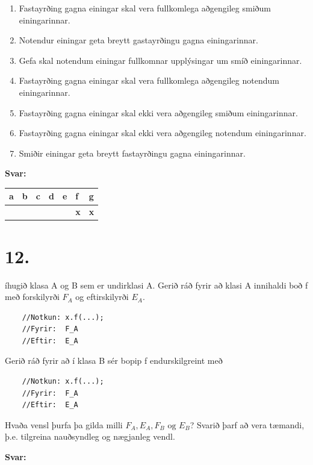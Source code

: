 \documentclass{article}
\newcommand{\sv}{\textbf{Svar:}}
\newcommand{\bo}[1]{\textbf{#1}}
\newcommand{\enum}{\begin{enumerate}[label = \alph*.]}
\begin{document}
    \enum
    \item Fastayrðing gagna einingar skal vera fullkomlega aðgengileg smiðum einingarinnar.
    \item Notendur einingar geta breytt gastayrðingu gagna einingarinnar.
    \item Gefa skal notendum einingar fullkomnar upplýsingar um smíð einingarinnar.
    \item Fastayrðing gagna einingar skal vera fullkomlega aðgengileg notendum einingarinnar.
    \item Fastayrðing gagna einingar skal ekki vera aðgengileg smiðum einingarinnar.
    \item Fastayrðing gagna einingar skal ekki vera aðgengileg notendum einingarinnar.
    \item Smiðir einingar geta breytt fastayrðingu gagna einingarinnar.
\end{enumerate}


    \sv

    
\begin{tabularx}{\textwidth}{ |X|X|X|X|X|X|X|}
    \hline
    \textbf{a}  & \textbf{b}  & \textbf{c}  & \textbf{d}  & \textbf{e}  & \textbf{f}  & \textbf{g} \\ \hline
     & & & & & \bo{x} & \bo{x} \\ \hline
 \end{tabularx}


 \newpage

 \section{12.}

 íhugið klasa A og B sem er undirklasi A. Gerið ráð fyrir að klasi A innihaldi boð f með forskilyrði $F_A$ og eftirskilyrði $E_A$.
 \begin{verbatim}
    //Notkun: x.f(...);
    //Fyrir:  F_A
    //Eftir:  E_A
 \end{verbatim}

 Gerið ráð fyrir að í klasa B sér bopip f endurskilgreint með
 \begin{verbatim}
    //Notkun: x.f(...);
    //Fyrir:  F_A
    //Eftir:  E_A
 \end{verbatim}

 Hvaða vensl þurfa þa gilda milli $F_A, E_A, F_B \text{ og } E_B$? Svarið þarf að
 vera tæmandi, þ.e. tilgreina nauðsyndleg og nægjanleg vendl.

 \sv

 \newpage
\end{document}
